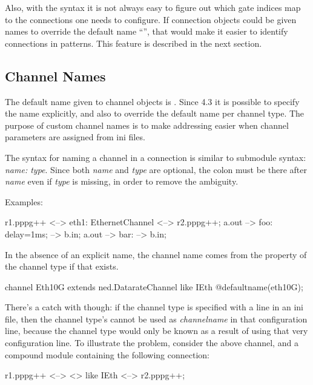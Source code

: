 Also, with the \ttt{++} syntax it is not always easy to figure out which
gate indices map to the connections one needs to configure. If connection
objects could be given names to override the default name
``'', that would make it easier to identify connections in
patterns. This feature is described in the next section.


\subsection{Channel Names}
\label{sec:ned-lang:channel-names}

The default name given to channel objects is . Since {\opp} 4.3
it is possible to specify the name explicitly, and also to override
the default name per channel type. The purpose of custom channel names is to make
addressing easier when channel parameters are assigned from ini files.

The syntax for naming a channel in a connection is similar to submodule syntax:
\textit{name: type}. Since both \textit{name} and \textit{type} are optional,
the colon must be there after \textit{name} even if \textit{type} is missing,
in order to remove the ambiguity.

Examples:

\begin{ned}
r1.pppg++ <--> eth1: EthernetChannel <--> r2.pppg++;
a.out --> foo: {delay=1ms;} --> b.in;
a.out --> bar: --> b.in;
\end{ned}

In the absence of an explicit name, the channel name comes from the
 property of the channel type if that exists.

\begin{ned}
channel Eth10G extends ned.DatarateChannel like IEth {
    @defaultname(eth10G);
}
\end{ned}

There's a catch with  though: if the channel type is
specified with a  line in an ini file, then
the channel type's  cannot be used as \textit{channelname}
in that configuration line, because the channel type would only be known as a
result of using that very configuration line. To illustrate the problem,
consider the above  channel, and a compound module containing the
following connection:

\begin{ned}
r1.pppg++ <--> <> like IEth <--> r2.pppg++;
\end{ned}

